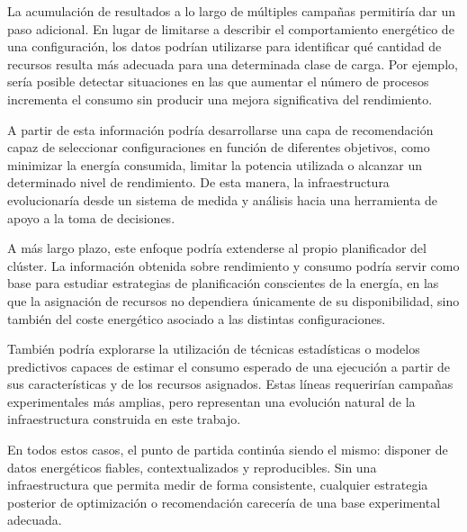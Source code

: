 La acumulación de resultados a lo largo de múltiples campañas permitiría dar un paso adicional. En lugar de limitarse a describir el comportamiento energético de una configuración, los datos podrían utilizarse para identificar qué cantidad de recursos resulta más adecuada para una determinada clase de carga. Por ejemplo, sería posible detectar situaciones en las que aumentar el número de procesos incrementa el consumo sin producir una mejora significativa del rendimiento.

A partir de esta información podría desarrollarse una capa de recomendación capaz de seleccionar configuraciones en función de diferentes objetivos, como minimizar la energía consumida, limitar la potencia utilizada o alcanzar un determinado nivel de rendimiento. De esta manera, la infraestructura evolucionaría desde un sistema de medida y análisis hacia una herramienta de apoyo a la toma de decisiones.

A más largo plazo, este enfoque podría extenderse al propio planificador del clúster. La información obtenida sobre rendimiento y consumo podría servir como base para estudiar estrategias de planificación conscientes de la energía, en las que la asignación de recursos no dependiera únicamente de su disponibilidad, sino también del coste energético asociado a las distintas configuraciones.

También podría explorarse la utilización de técnicas estadísticas o modelos predictivos capaces de estimar el consumo esperado de una ejecución a partir de sus características y de los recursos asignados. Estas líneas requerirían campañas experimentales más amplias, pero representan una evolución natural de la infraestructura construida en este trabajo.

En todos estos casos, el punto de partida continúa siendo el mismo: disponer de datos energéticos fiables, contextualizados y reproducibles. Sin una infraestructura que permita medir de forma consistente, cualquier estrategia posterior de optimización o recomendación carecería de una base experimental adecuada.